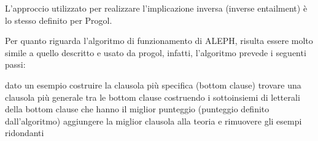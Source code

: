 L'approccio utilizzato per realizzare l'implicazione inversa (inverse entailment) è lo stesso definito per Progol.

Per quanto riguarda l'algoritmo di funzionamento di ALEPH, risulta essere molto simile a quello descritto e usato da progol, infatti, l'algoritmo prevede i seguenti passi:

\begin{algorithm}
	\begin{algorithmic}[1]
		\STATE dato un esempio costruire la clausola più specifica (bottom clause)
		\STATE trovare una clausola più generale tra le bottom clause costruendo i sottoinsiemi di letterali della bottom clause che hanno il miglior punteggio (punteggio definito dall'algoritmo)
		\STATE aggiungere la miglior clausola alla teoria e rimuovere gli esempi ridondanti 
		\ENDFOR
	\end{algorithmic}
\end{algorithm}

\nocite{aleph}